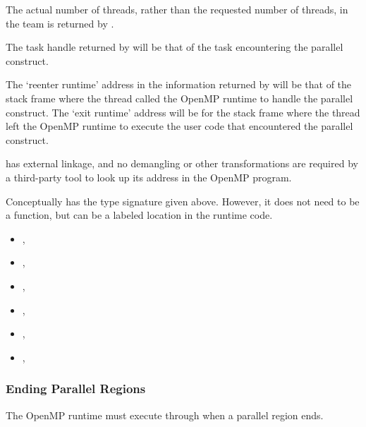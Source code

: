 The actual number of threads, rather than the requested number of threads,
in the team is returned by
.

The task handle returned by
will be that of the task encountering the parallel construct.

The `reenter runtime' address in the information returned by
will be that of the stack frame where the thread called the OpenMP
runtime to handle the parallel construct.
The `exit runtime' address will be for the stack frame where the thread
left the OpenMP runtime to execute the user code that encountered
the parallel construct.

\restrictions

 has external  linkage, and no
demangling or other transformations are required by a third-party tool
to look up its address in the OpenMP program.

Conceptually  has the type signature
given above.
However, it does not need to be a function, but can be a labeled location
in the runtime code.

\crossreferences

\begin{itemize}
\item
  , 
\item
  , 
\item
  , 
\item
  , 
\item
  , 
\item
  , 
\end{itemize}

\subsubsection{Ending Parallel Regions}
\label{sec:ompd:ompd_bp_parallel_end}

The OpenMP runtime must execute through 
when a parallel region ends.

